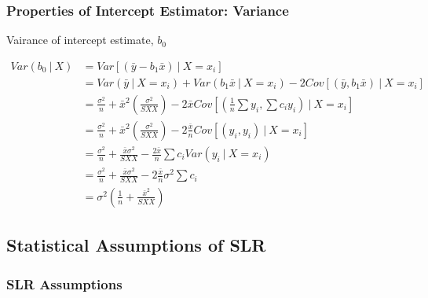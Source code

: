 \documentclass[11pt]{article}
\theoremstyle{definition}
\numberwithin{equation}{section}
\begin{document}
\subsubsection{Properties of Intercept Estimator: Variance}

Vairance of intercept estimate, $b_0$

\begin{align}
  Var(b_0\>|\> X) &= Var[(\bar{y} - b_1\bar{x})\>|\> X = x_i]\\
  &= Var(\bar{y}\>|\> X = x_i) + Var(b_1\bar{x}\>|\>X = x_i) - 2Cov[(\bar{y},b_1\bar{x})\>|\> X=  x_i]\\
  &= \frac{\sigma^2}{n}+ \bar{x}^2\left( \frac{\sigma^2}{SXX} \right) - 2\bar{x}Cov\left[ \left(\frac{1}{n}\sum y_i,\sum c_iy_i\right)\>|\>X = x_i \right]\\
  &= \frac{\sigma^2}{n}+ \bar{x}^2\left( \frac{\sigma^2}{SXX} \right) - 2\frac{\bar{x}}{n}Cov\left[ \left(y_i,y_i\right)\>|\>X = x_i \right]\\
  &= \frac{\sigma^2}{n} + \frac{\bar{x}\sigma^2}{SXX} - \frac{2\bar{x}}{n}\sum c_i Var(y_i\>|\> X = x_i)\\
  &= \frac{\sigma^2}{n} + \frac{\bar{x}\sigma^2}{SXX} - 2\frac{\bar{x}}{n}\sigma^2\sum c_i\\
  &= \sigma^2\left(\frac{1}{n} + \frac{\bar{x}^2}{SXX}\right)
\end{align}

\subsection{Statistical Assumptions of SLR}
\subsubsection{SLR Assumptions}
\end{document}
